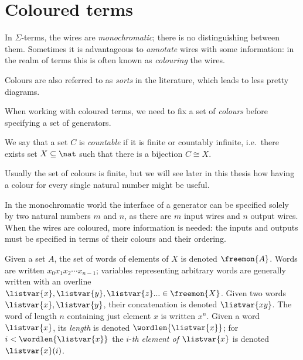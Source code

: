 \section{Coloured terms}

In \(\Sigma\)-terms, the wires are \emph{monochromatic}; there is no
distinguishing between them.
Sometimes it is advantageous to \emph{annotate} wires with some information: in
the realm of terms this is often known as \emph{colouring} the wires.

\begin{remark}
    Colours are also referred to as \emph{sorts} in the literature, which leads
    to less pretty diagrams.
\end{remark}

When working with coloured terms, we need to fix a set of \emph{colours} before
specifying a set of generators.

\begin{notation}
    We say that a set \(C\) is \emph{countable} if it is finite or countably
    infinite, i.e.\ there exists set \(X \subseteq \nat\) such that there is a
    bijection \(C \cong X\).
\end{notation}

\begin{remark}
    Usually the set of colours is finite, but we will see later in this thesis
    how having a colour for every single natural number might be useful.
\end{remark}

In the monochromatic world the interface of a generator can be specified solely
by two natural numbers \(m\) and \(n\), as there are \(m\) input wires and
\(n\) output wires.
When the wires are coloured, more information is needed: the inputs and outputs
must be specified in terms of their colours and their ordering.

\begin{notation}[Words]
    Given a set \(A\), the set of words of elements of \(X\) is denoted
    \(\freemon{A}\).
    Words are written \(x_0x_1x_2{\cdots}x_{n-1}\); variables representing
    arbitrary words are generally written with an
    overline \(
    \listvar{x}, \listvar{y}, \listvar{z}... \in \freemon{X}
    \).
    Given two words \(\listvar{x}, \listvar{y}\), their concatenation is
    denoted \(\listvar{xy}\).
    The word of length \(n\) containing just element \(x\) is written \(x^n\).
    Given a word \(\listvar{x}\), its \emph{length} is denoted
    \(\wordlen{\listvar{x}}\); for \(i < \wordlen{\listvar{x}}\) the
    \(i\)-\emph{th element of \(\listvar{x}\)} is denoted \(\listvar{x}(i)\).
\end{notation}

